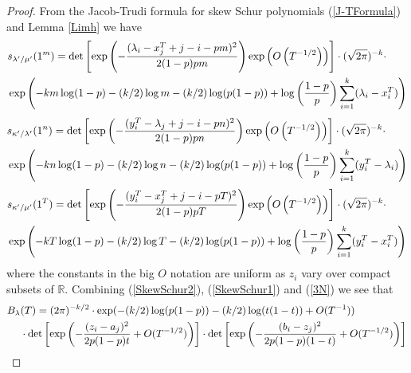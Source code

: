 \begin{proof}
	
From the Jacob-Trudi formula for skew Schur polynomials (\ref{J-TFormula}) and Lemma \ref{Limh} we have
\begin{align}{\label{SkewSchur1}}
	\begin{split}
		& s_{\lambda^{\prime}/\mu^{\prime}}(1^{m})=\det\left[\exp\left(-\frac{(\lambda_{i}-x_{j}^{T}+j-i-pm)^{2}}{2(1-p)pm}\right)\exp\left(O\left( T^{-1/2}\right)\right)\right]\cdot (\sqrt{2\pi})^{-k}\cdot\\
		& \exp\left(-km\log(1-p)-(k/2)\log m-(k/2)\log(p(1-p))+\log\left(\frac{1-p}{p}\right)\sum_{i=1}^{k}(\lambda_{i}-x^{T}_{i})\right)
	\end{split}
\end{align}
\begin{align}{\label{SkewSchur2}}
	\begin{split}
		& s_{\kappa^{\prime}/\lambda^{\prime}}(1^{n})=\det\left[\exp\left(-\frac{(y_i^{T}-\lambda_{j}+j-i-pn)^{2}}{2(1-p)pn}\right)\exp\left(O\left( T^{-1/2}\right)\right)\right]\cdot (\sqrt{2\pi})^{-k}\cdot\\
		& \exp\left(-kn\log(1-p)-(k/2)\log n-(k/2)\log(p(1-p))+\log\left(\frac{1-p}{p}\right)\sum_{i=1}^{k}(y_{i}^{T}-\lambda_{i})\right)
	\end{split}
\end{align}
\begin{align}{\label{SkewSchur3}}
	\begin{split}
		& s_{\kappa^{\prime}/\mu^{\prime}}(1^{T})=\det\left[\exp\left(-\frac{(y_{i}^{T}-x_{j}^{T}+j-i-pT)^{2}}{2(1-p)pT}\right)\exp\left(O\left( T^{-1/2}\right)\right)\right]\cdot (\sqrt{2\pi})^{-k}\cdot\\
		& \exp\left(-kT\log(1-p)-(k/2)\log T-(k/2)\log(p(1-p))+\log\left(\frac{1-p}{p}\right)\sum_{i=1}^{k}(y_{i}^{T}-x^{T}_{i})\right)
	\end{split}
\end{align}
where the constants in the big $O$ notation are uniform as $z_{i}$ vary over compact subsets of $\mathbb{R}$. Combining (\ref{SkewSchur2}), (\ref{SkewSchur1}) and (\ref{3N}) we see that
\begin{align}{\label{BLambdafinal}}
	\begin{split}
		B_{\lambda}&(T)=(2\pi)^{-k/2}\cdot\exp(-(k/2)\log(p(1-p))-(k/2)\log(t(1-t))+O(T^{-1}))\\
		& \cdot \det\left[\exp\left(-\frac{(z_i-a_j)^2}{2p(1-p)t}+O(T^{-1/2})\right)\right]\cdot\det\left[\exp\left(-\frac{(b_i-z_j)^2}{2p(1-p)(1-t)}+O(T^{-1/2})\right)\right]

\end{split}
\end{align}
\end{proof}
